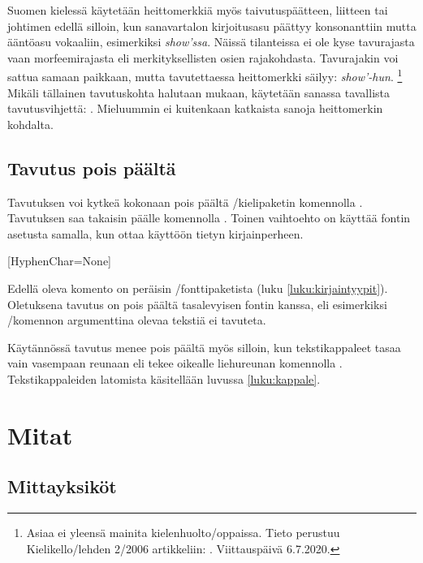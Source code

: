 Suomen kielessä käytetään heittomerkkiä myös taivutuspäätteen, liitteen
tai johtimen edellä silloin, kun sanavartalon kir\-joi\-tus\-asu päättyy
konsonanttiin mutta ääntö\-asu vokaaliin, esimerkiksi \emph{show'ssa}.
Näissä tilanteissa ei ole kyse tavurajasta vaan morfeemirajasta eli
merkityksellisten osien rajakohdasta. Tavurajakin voi sattua samaan
paikkaan, mutta tavutettaessa heittomerkki säilyy: \emph{show'-hun}.%
\footnote{Asiaa ei yleensä mainita kielenhuolto\-/oppaissa. Tieto
  perustuu Kielikello\-/lehden 2/2006 artikkeliin:
  . Viittauspäivä
  6.7.2020.} Mikäli tällainen tavutuskohta halutaan mukaan, käytetään
sanassa tavallista tavutusvihjettä: . Mieluummin
ei kuitenkaan katkaista sanoja heittomerkin kohdalta.

\subsection{Tavutus pois päältä}

Tavutuksen voi kytkeä kokonaan pois päältä
\-/kielipaketin komennolla%
 . Tavutuksen saa takaisin päälle komennolla
. Toinen vaihtoehto on käyttää
fontin asetusta  samalla, kun ottaa
käyttöön tietyn kirjainperheen.

\begin{koodilohkosis}
  \setmainfont{Fontin nimi}[HyphenChar=None]
\end{koodilohkosis}

Edellä oleva komento on peräisin \-/fonttipaketista
(luku \ref{luku:kirjaintyypit}). Oletuksena tavutus on pois päältä
tasalevyisen fontin kanssa, eli esimerkiksi \-/komennon argumenttina olevaa tekstiä ei tavu\-teta.

Käytännössä tavutus menee pois päältä myös silloin, kun tekstikappaleet
tasaa vain vasempaan reunaan eli tekee oikealle liehureunan komennolla
. Tekstikappaleiden latomista käsitellään
luvussa \ref{luku:kappale}.

\section{Mitat}
\label{luku:mitat}

\subsection{Mittayksiköt}

